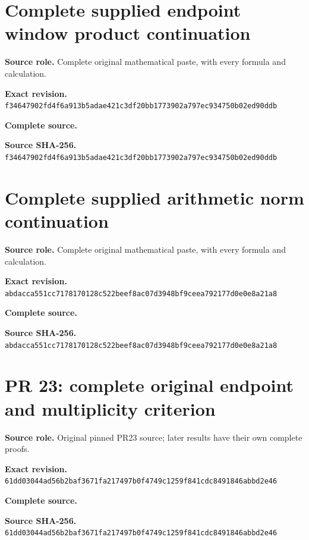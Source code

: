 \begingroup
\sloppy
\small
\clearpage
\section{Complete supplied endpoint window product continuation}
\noindent\textbf{Source role.} Complete original mathematical paste, with every formula and calculation.\par
\noindent\textbf{Exact revision.} \nolinkurl{f34647902fd4f6a913b5adae421c3df20bb1773902a797ec934750b02ed90ddb}\par
\noindent\textbf{Complete source.} \par
\noindent\textbf{Source SHA-256.} \nolinkurl{f34647902fd4f6a913b5adae421c3df20bb1773902a797ec934750b02ed90ddb}\par\medskip

\endgroup

\begingroup
\sloppy
\small
\clearpage
\section{Complete supplied arithmetic norm continuation}
\noindent\textbf{Source role.} Complete original mathematical paste, with every formula and calculation.\par
\noindent\textbf{Exact revision.} \nolinkurl{abdacca551cc7178170128c522beef8ac07d3948bf9ceea792177d0e0e8a21a8}\par
\noindent\textbf{Complete source.} \par
\noindent\textbf{Source SHA-256.} \nolinkurl{abdacca551cc7178170128c522beef8ac07d3948bf9ceea792177d0e0e8a21a8}\par\medskip

\endgroup

\begingroup
\sloppy
\small
\clearpage
\section{PR 23: complete original endpoint and multiplicity criterion}
\noindent\textbf{Source role.} Original pinned PR23 source; later results have their own complete proofs.\par
\noindent\textbf{Exact revision.} \nolinkurl{61dd03044ad56b2baf3671fa217497b0f4749c1259f841cdc8491846abbd2e46}\par
\noindent\textbf{Complete source.} \par
\noindent\textbf{Source SHA-256.} \nolinkurl{61dd03044ad56b2baf3671fa217497b0f4749c1259f841cdc8491846abbd2e46}\par\medskip

\endgroup


